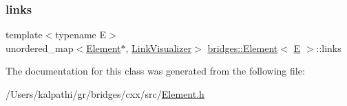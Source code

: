 \subsubsection{\texorpdfstring{links}{links}}
{\footnotesize\ttfamily template$<$typename E$>$ \\
unordered\+\_\+map$<$\mbox{\hyperlink{classbridges_1_1_element}{Element}}$\ast$, \mbox{\hyperlink{classbridges_1_1_link_visualizer}{Link\+Visualizer}}$>$ \mbox{\hyperlink{classbridges_1_1_element}{bridges\+::\+Element}}$<$ \mbox{\hyperlink{namespacebridges_acfb0a4f7877d8f63de3e6862004c50eda3a3ea00cfc35332cedf6e5e9a32e94da}{E}} $>$\+::links\hspace{0.3cm}{\ttfamily [protected]}}



The documentation for this class was generated from the following file\+:\begin{DoxyCompactItemize}
\item 
/\+Users/kalpathi/gr/bridges/cxx/src/\mbox{\hyperlink{_element_8h}{Element.\+h}}\end{DoxyCompactItemize}
